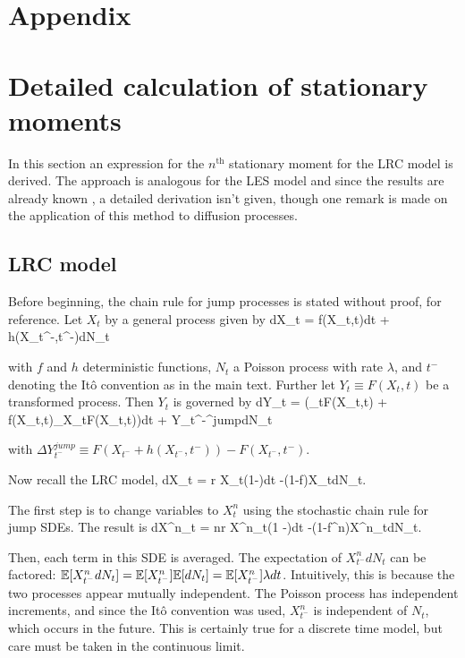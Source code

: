 
\section*{Appendix}
\section{Detailed calculation of stationary moments}
In this section an expression for the $n^{\text{th}}$ stationary moment for the LRC model is derived.  The approach is analogous for the LES model and since the results are already known \cite{engen2000}, a detailed derivation isn't given, though one remark is made on the application of this method to diffusion processes.

\subsection{LRC model}

Before beginning, the chain rule for jump processes \cite{hansonBook} is stated without proof, for reference.  Let $X_t$ by a general process given by
\be
dX_t = f(X_t,t)dt + h(X_{t^-},t^-)dN_t
\ee

\noindent with $f$ and $h$ deterministic functions, $N_t$ a Poisson process with rate $\lambda$, and $t^-$ denoting the It\^{o} convention as in the main text.  Further let $Y_t \equiv F(X_t,t)$ be a transformed process.  Then $Y_t$ is governed by
\be
dY_t = \left(\partial_tF(X_t,t) + f(X_t,t)\partial_{X_t}F(X_t,t)\right)dt + \Delta Y_{t^-}^{jump}dN_t
\ee

\noindent with $\Delta Y_{t^-}^{jump} \equiv F(X_{t^-} + h(X_{t^-},t^-)) - F(X_{t^-},t^-)$.


Now recall the LRC model,
\be
dX_t = r X_t\left(1-\right)dt  -(1-f)X_tdN_t.
\ee

\noindent The first step is to change variables to $X^n_t$ using the stochastic chain rule for jump SDEs.  The result is
\be
dX^n_t = nr X^n_t\left(1 -\right)dt -(1-f^n)X^n_tdN_t.
\ee

\noindent Then, each term in this SDE is averaged.  The expectation of $X^n_{t^-}dN_t$ can be factored:  $\mathbb{E}[X^n_{t^-}dN_t] = \mathbb{E}[X^n_{t^-}]\mathbb{E}[dN_t] = \mathbb{E}[X^n_{t^-}]\lambda dt$.  Intuitively, this is because the two processes appear mutually independent.  The Poisson process has independent increments, and since the It\^{o} convention was used, $X^n_{t^-}$ is independent of $N_t$, which occurs in the future.  This is certainly true for a discrete time model, but care must be taken in the continuous limit.  

